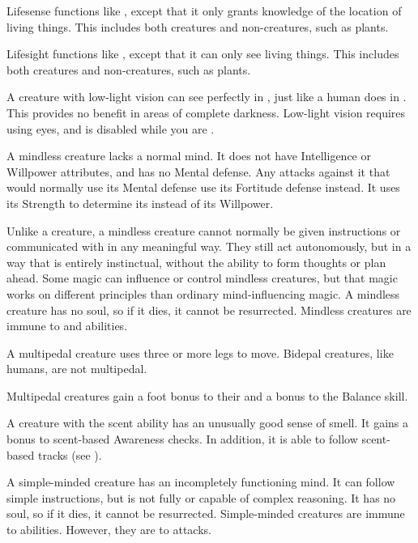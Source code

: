   Lifesense functions like , except that it only grants knowledge of the location of living things.
  This includes both creatures and non-creatures, such as plants.

  Lifesight functions like , except that it can only see living things.
  This includes both creatures and non-creatures, such as plants.

  A creature with low-light vision can see perfectly in , just like a human does in .
  This provides no benefit in areas of complete darkness.
  Low-light vision requires using eyes, and is disabled while you are \dazzled.

  A mindless creature lacks a normal mind.
  It does not have Intelligence or Willpower attributes, and has no Mental defense.
  Any attacks against it that would normally use its Mental defense use its Fortitude defense instead.
  It uses its Strength to determine its  instead of its Willpower.

  Unlike a  creature, a mindless creature cannot normally be given instructions or communicated with in any meaningful way.
  They still act autonomously, but in a way that is entirely instinctual, without the ability to form thoughts or plan ahead.
  Some magic can influence or control mindless creatures, but that magic works on different principles than ordinary mind-influencing magic.
  A mindless creature has no soul, so if it dies, it cannot be resurrected.
  Mindless creatures are immune to  and  abilities.

  A multipedal creature uses three or more legs to move.
  Bidepal creatures, like humans, are not multipedal.

  Multipedal creatures gain a  foot bonus to their  and a  bonus to the Balance skill.

  A creature with the scent ability has an unusually good sense of smell.
  It gains a  bonus to scent-based Awareness checks.
  In addition, it is able to follow scent-based tracks (see ).

  A simple-minded creature has an incompletely functioning mind.
  It can follow simple instructions, but is not fully  or capable of complex reasoning.
  It has no soul, so if it dies, it cannot be resurrected.
  Simple-minded creatures are immune to  abilities.
  However, they are \vulnerable to  attacks.

